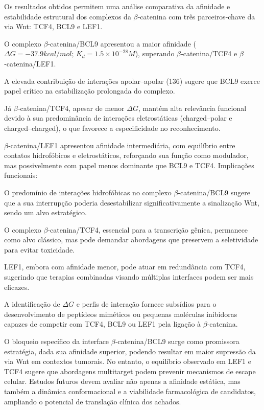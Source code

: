 Os resultados obtidos permitem uma análise comparativa da afinidade e estabilidade
estrutural dos complexos da $\beta$‑catenina com três parceiros-chave da via Wnt: TCF4, BCL9 e
LEF1.

O complexo $\beta$‑catenina/BCL9 apresentou a maior afinidade ($\Delta G = -37.9 kcal/mol$;
$K_d = 1.5 \times 10^{-28} M$), superando $\beta$‑catenina/TCF4 e $\beta$‑catenina/LEF1.

A elevada contribuição de interações apolar–apolar (136) sugere que BCL9 exerce
papel crítico na estabilização prolongada do complexo.

Já $\beta$‑catenina/TCF4, apesar de menor $\Delta G$, mantém alta relevância funcional devido
à sua predominância de interações eletrostáticas (charged–polar e
charged–charged), o que favorece a especificidade no reconhecimento.

$\beta$‑catenina/LEF1 apresentou afinidade intermediária, com equilíbrio entre contatos
hidrofóbicos e eletrostáticos, reforçando sua função como modulador, mas
possivelmente com papel menos dominante que BCL9 e TCF4.
Implicações funcionais:

O predomínio de interações hidrofóbicas no complexo $\beta$‑catenina/BCL9 sugere que
a sua interrupção poderia desestabilizar significativamente a sinalização Wnt, sendo
um alvo estratégico.

O complexo $\beta$‑catenina/TCF4, essencial para a transcrição gênica, permanece como
alvo clássico, mas pode demandar abordagens que preservem a seletividade para
evitar toxicidade.

LEF1, embora com afinidade menor, pode atuar em redundância com TCF4,
sugerindo que terapias combinadas visando múltiplas interfaces podem ser mais
eficazes.

A identificação de $\Delta G$ e perfis de interação fornece subsídios para o
desenvolvimento de peptídeos miméticos ou pequenas moléculas inibidoras capazes
de competir com TCF4, BCL9 ou LEF1 pela ligação à $\beta$‑catenina.

O bloqueio específico da interface $\beta$‑catenina/BCL9 surge como promissora
estratégia, dada sua afinidade superior, podendo resultar em maior supressão da via
Wnt em contextos tumorais. No entanto, o equilíbrio observado em LEF1 e TCF4 sugere que abordagens
multitarget podem prevenir mecanismos de escape celular. Estudos futuros devem avaliar não apenas a afinidade estática, mas também a dinâmica conformacional e a viabilidade farmacológica de candidatos, ampliando o potencial de translação clínica dos achados.